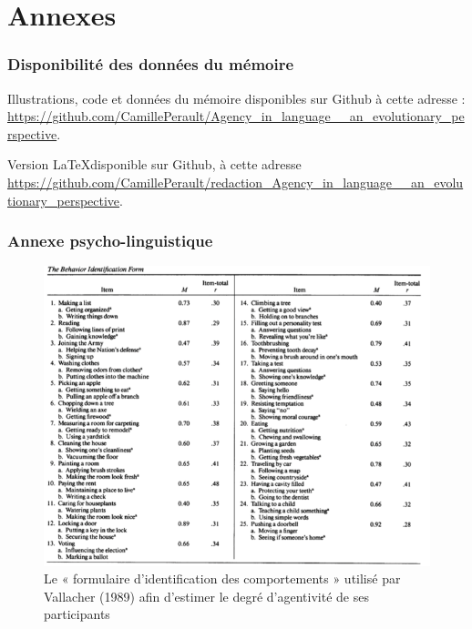 \appendix
\part*{Annexes}
\pagestyle{myheadings}

\section{Disponibilité des données du mémoire}\label{code}

Illustrations, code et données du mémoire disponibles sur Github à cette adresse : \url{https://github.com/CamillePerault/Agency_in_language__an_evolutionary_perspective}. 

Version \LaTeX disponible sur Github, à cette adresse \url{https://github.com/CamillePerault/redaction_Agency_in_language__an_evolutionary_perspective}.

\section{Annexe psycho-linguistique}\label{Vallacher_grille}

\begin{figure}[!ht]
    \centering
    \includegraphics[width=15cm]{img/Vallacher_grille_annexe.png}
    \caption{Le « formulaire d'identification des comportements » utilisé par Vallacher (1989) afin d'estimer le degré d'agentivité de ses participants}
    \label{lm_statut}
\end{figure}

